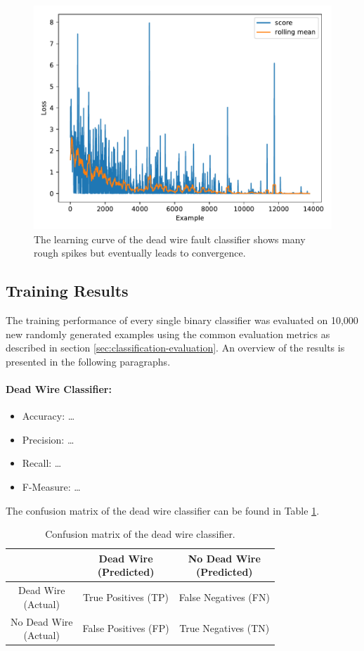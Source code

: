 \begin{figure}[h]
  \centering
  \includegraphics[width=.8\textwidth]{../figures/score_test}
  \caption{The learning curve of the dead wire fault classifier
    shows many rough spikes but eventually leads to convergence.}
  \label{fig:learning-curve}
\end{figure}

\subsection{Training Results}

The training performance of every single binary classifier was
evaluated on 10,000 new randomly generated
examples using the common evaluation metrics as described in section
\ref{sec:classification-evaluation}. An overview of the results is
presented in the following paragraphs.

\paragraph{Dead Wire Classifier:}
\begin{itemize}
  \item Accuracy: \ldots
  \item Precision: \ldots
  \item Recall: \ldots
  \item F-Measure: \ldots
\end{itemize}
The confusion matrix of the dead wire classifier can be found in Table
\ref{tbl:confusion-deadwire}.
\begin{table}[h]
  \centering
  \renewcommand\theadfont{\bfseries}
  \begin{tabular}{|c|c|c|}
    \hline
    & \thead{Dead Wire\\(Predicted)} & \thead{No Dead Wire\\(Predicted)} \\
    \hline
    \thead{Dead Wire\\(Actual)} & True Positives (TP) & False
    Negatives (FN) \\
    \hline
    \thead{No Dead Wire\\(Actual)} & False Positives (FP) & True
    Negatives (TN) \\
    \hline
  \end{tabular}
  \caption{Confusion matrix of the dead wire classifier.}
  \label{tbl:confusion-deadwire}
\end{table}

